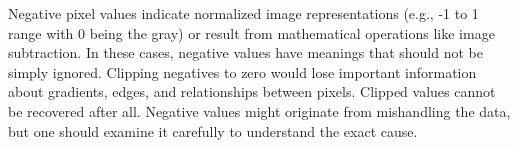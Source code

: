Negative pixel values indicate normalized image representations (e.g., -1 to 1 range with 0 being the gray) or result from mathematical operations like image subtraction. In these cases, negative values have meanings that should not be simply ignored.
Clipping negatives to zero would lose important information about gradients, edges, and relationships between pixels. Clipped values cannot be recovered after all. Negative values might originate from mishandling the data, but one should examine it carefully to understand the exact cause.
